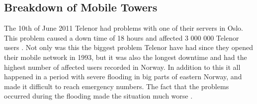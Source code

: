 \subsection{Breakdown of Mobile Towers}

The 10th of June 2011 Telenor had problems with one of their servers in Oslo. This problem caused a down time of 18 hours and affected 3 000 000 Telenor users \cite{listeNedetid}. Not only was this the biggest problem Telenor have had since they opened their mobile network in 1993, but it was also the longest downtime and had the highest number of affected users recorded in Norway. In addition to this it all happened in a period with severe flooding in big parts of eastern Norway, and made it difficult to reach emergency numbers. The fact that the problems occurred during the flooding made the situation much worse \cite{TelenorNede}.
